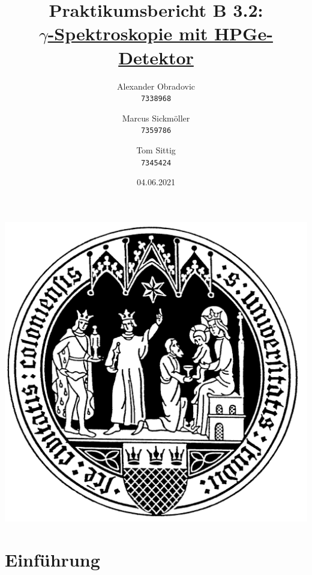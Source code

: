 \documentclass{article}
\title{Praktikumsbericht B 3.2: \\ \underline{$\gamma$-Spektroskopie mit HPGe-Detektor}}
\author{Alexander Obradovic\\
		\texttt{7338968}
		\and
		Marcus Sickmöller\\
		\texttt{7359786}
		\and
		Tom Sittig\\
		\texttt{7345424}}
\date{04.06.2021}
\begin{document}
	\maketitle
	\begin{center}
	\includegraphics[scale=0.13]{siegel.jpg}
	\end{center}
	
	\newpage
	\tableofcontents
	\newpage
	\section{Einführung}
	\newpage
\end{document}
